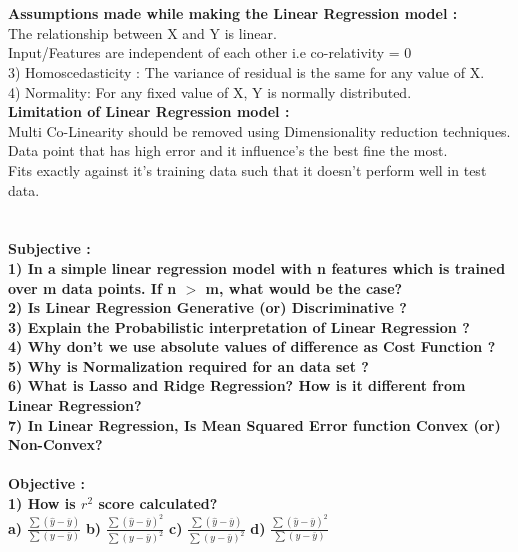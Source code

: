 \documentclass{homework}
\begin{document}
\section{}

\textbf{Assumptions made while making the Linear Regression model :}\\
 The relationship between X and Y is linear.\\
 Input/Features are independent of each other i.e co-relativity = 0\\
3) Homoscedasticity : The variance of residual is the same for any value of X.\\
4) Normality: For any fixed value of X, Y is normally distributed.\\
\textbf{Limitation of Linear Regression model :}\\
 Multi Co-Linearity should be removed using Dimensionality reduction techniques.\\
 Data point that has high error and it influence's the best fine the most.\\
Fits exactly against it's training data such that it doesn't perform well in test data.
\section{}
\textbf{Subjective : \\}
\textbf{1) In a simple linear regression model with n features which is trained over m data points. If n $>$ m, what would be the case?\\
2) Is Linear Regression Generative (or) Discriminative ?\\
3) Explain the Probabilistic interpretation of Linear Regression ?\\
4) Why don't we use absolute values of difference as Cost Function ?\\
5) Why is Normalization required for an data set ?\\
6) What is Lasso and Ridge Regression? How is it different from Linear Regression?\\
7) In Linear Regression, Is Mean Squared Error function Convex (or) Non-Convex?}\\
 \\
\textbf{Objective :}\\
\textbf{1) How is $r^2$ score calculated?}\\
\textbf{a)} $\displaystyle\frac{\sum(\hat{y}-\bar{y})}{\sum(y-\bar{y})}$ \indent \textbf{b)} $\displaystyle\frac{\sum(\hat{y}-\bar{y})^2}{\sum(y-\bar{y})^2}$ \indent \textbf{c)} $\displaystyle\frac{\sum(\hat{y}-\bar{y})}{\sum(y-\bar{y})^2}$ \indent \textbf{d)} $\displaystyle\frac{\sum(\hat{y}-\bar{y})^2}{\sum(y-\bar{y})}$
\end{document}
